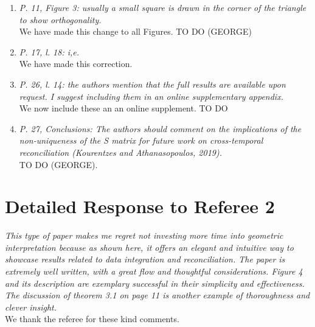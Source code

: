 \documentclass[a4paper,11pt]{article}
\begin{document}
\begin{enumerate}
	    \item \textit{P. 11, Figure 3: usually a small square is drawn in the corner of the triangle to show orthogonality.}\\
	    
	    We have made this change to all Figures. TO DO (GEORGE)\\
	    
	    \item \textit{P. 17, l. 18: i,e.}\\
	    
	    We have made this correction.\\
	    
	    \item \textit{P. 26, l. 14: the authors mention that the full results are available upon request. I suggest including them in an online supplementary appendix.}\\
	    
	    We now include these an an online supplement. TO DO\\
	    
	    \item \textit{P. 27, Conclusions: The authors should comment on the implications of the non-uniqueness of the S matrix for future work on cross-temporal reconciliation (Kourentzes and Athanasopoulos, 2019).}\\
	    
	    TO DO (GEORGE).\\
	    
    \end{enumerate}

    \section*{Detailed Response to Referee 2}

	\noindent \textit{This type of paper makes me regret not investing more time into geometric interpretation because as shown here, it offers an elegant and intuitive way to showcase results related to data integration and reconciliation. The paper is extremely well written, with a great flow and thoughtful considerations. Figure 4 and its description are exemplary successful in their simplicity and effectiveness. The discussion of theorem 3.1 on page 11 is another example of thoroughness and clever insight.}\\
	
	\noindent We thank the referee for these kind comments.\\
	
\end{document}
